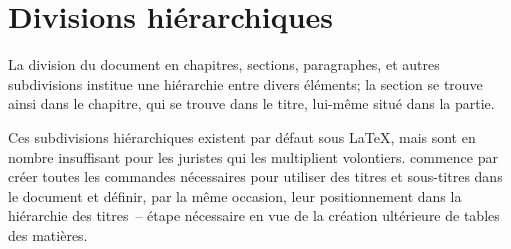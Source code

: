 
\section{Divisions hiérarchiques}



La division du document en chapitres, sections, paragraphes, et autres subdivisions institue une hiérarchie entre divers éléments; la section se trouve ainsi dans le chapitre, qui se trouve dans le titre, lui-même situé dans la partie.

Ces subdivisions hiérarchiques existent par défaut sous \LaTeX, mais sont en nombre insuffisant pour les juristes qui les multiplient volontiers. \frenchlaw commence par créer toutes les commandes nécessaires pour utiliser des titres et sous-titres dans le document et définir, par la même occasion, leur positionnement dans la hiérarchie des titres~-- étape nécessaire en vue de la création ultérieure de tables des matières.

\begin{noprint}
\end{noprint}


